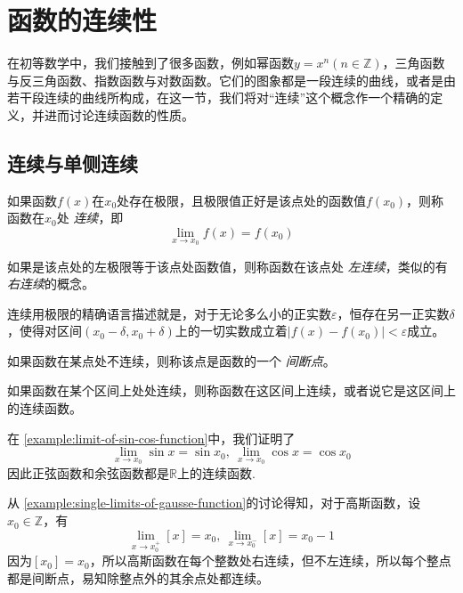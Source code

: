 
\section{函数的连续性}
\label{sec:continuousness-of-function}

在初等数学中，我们接触到了很多函数，例如幂函数$y=x^n(n \in \mathbb{Z})$，三角函数与反三角函数、指数函数与对数函数。它们的图象都是一段连续的曲线，或者是由若干段连续的曲线所构成，在这一节，我们将对“连续”这个概念作一个精确的定义，并进而讨论连续函数的性质。

\subsection{连续与单侧连续}
\label{sec:continuousness-and-single-continuousness}

\begin{definition}
  如果函数$f(x)$在$x_0$处存在极限，且极限值正好是该点处的函数值$f(x_0)$，则称函数在$x_0$处 \emph{连续}，即
  \[ \lim_{x \to x_0} f(x) = f(x_0) \]
\end{definition}

如果是该点处的左极限等于该点处函数值，则称函数在该点处 \emph{左连续}，类似的有 \emph{右连续}的概念。

连续用极限的精确语言描述就是，对于无论多么小的正实数$\varepsilon$，恒存在另一正实数$\delta$，使得对区间$(x_0-\delta, x_0+\delta)$上的一切实数成立着$|f(x)-f(x_0)|<\varepsilon$成立。

如果函数在某点处不连续，则称该点是函数的一个 \emph{间断点}。

\begin{definition}
  如果函数在某个区间上处处连续，则称函数在这区间上连续，或者说它是这区间上的连续函数。
\end{definition}

\begin{example}
  在 \autoref{example:limit-of-sin-cos-function}中，我们证明了
  \[ \lim_{x \to x_0} \sin{x} = \sin{x_0}, \  \lim_{x \to x_0} \cos{x} = \cos{x_0} \]
  因此正弦函数和余弦函数都是$\mathbb{R}$上的连续函数.
\end{example}

\begin{example}
  从 \autoref{example:single-limits-of-gausse-function}的讨论得知，对于高斯函数，设$x_0 \in \mathbb{Z}$，有
    \[ \lim_{x \to x_0^+} [x] = x_0, \  \lim_{x \to x_0^-} [x] = x_0-1 \]
    因为$[x_0]=x_0$，所以高斯函数在每个整数处右连续，但不左连续，所以每个整点都是间断点，易知除整点外的其余点处都连续。
\end{example}

